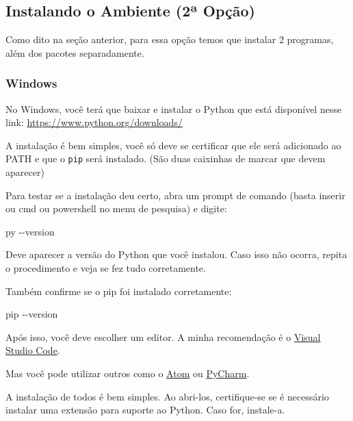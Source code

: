 \documentclass[a4paper, 11pt, brazilian]{article}
\newenvironment{Shaded}{}{}
\newcommand{\ExtensionTok}[1]{{#1}}
\newcommand{\AttributeTok}[1]{\textcolor[rgb]{0.49,0.56,0.16}{{#1}}}
\begin{document}
\hypertarget{instalando-o-ambiente-2uxaa-opuxe7uxe3o}{%
\subsection{Instalando o Ambiente (2ª
Opção)}\label{instalando-o-ambiente-2uxaa-opuxe7uxe3o}}

Como dito na seção anterior, para essa opção temos que instalar 2
programas, além dos pacotes separadamente.

\hypertarget{windows-1}{%
\subsubsection{Windows}\label{windows-1}}

No Windows, você terá que baixar e instalar o Python que está disponível
nesse link: \url{https://www.python.org/downloads/}

A instalação é bem simples, você só deve se certificar que ele será
adicionado ao PATH e que o \texttt{pip} será instalado. (São duas
caixinhas de marcar que devem aparecer)

Para testar se a instalação deu certo, abra um prompt de comando (basta
inserir ou cmd ou powershell no menu de pesquisa) e digite:

\begin{Shaded}
\begin{Highlighting}[]
\ExtensionTok{py} \AttributeTok{{-}{-}version}
\end{Highlighting}
\end{Shaded}

Deve aparecer a versão do Python que você instalou. Caso isso não
ocorra, repita o procedimento e veja se fez tudo corretamente.

Também confirme se o pip foi instalado corretamente:

\begin{Shaded}
\begin{Highlighting}[]
\ExtensionTok{pip} \AttributeTok{{-}{-}version}
\end{Highlighting}
\end{Shaded}

Após isso, você deve escolher um editor. A minha recomendação é o
\href{https://code.visualstudio.com/}{Visual Studio Code}.

Mas você pode utilizar outros como o \href{https://atom.io/}{Atom} ou
\href{https://www.jetbrains.com/pt-br/pycharm/download/}{PyCharm}.

A instalação de todos é bem simples. Ao abri-los, certifique-se se é
necessário instalar uma extensão para suporte ao Python. Caso for,
instale-a.
\end{document}

